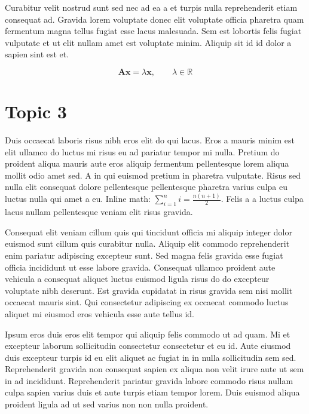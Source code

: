 \documentclass[11pt,a4paper]{article}
\begin{document}
Curabitur velit nostrud sunt sed nec ad ea a et turpis nulla
reprehenderit etiam consequat ad. Gravida lorem voluptate donec elit
voluptate officia pharetra quam fermentum magna tellus fugiat esse lacus
malesuada. Sem est lobortis felis fugiat vulputate et ut elit nullam
amet est voluptate minim. Aliquip sit id id dolor a sapien sint est et.

\begin{equation}
  \mathbf{A}\mathbf{x} = \lambda \mathbf{x}, \qquad \lambda \in \mathbb{R}
\end{equation}

\section{Topic 3}
Duis occaecat laboris risus nibh eros elit do qui lacus. Eros a mauris
minim est elit ullamco do luctus mi risus eu ad pariatur tempor mi
nulla. Pretium do proident aliqua mauris aute eros aliquip fermentum
pellentesque lorem aliqua mollit odio amet sed. A in qui euismod pretium
in pharetra vulputate. Risus sed nulla elit consequat dolore
pellentesque pellentesque pharetra varius culpa eu luctus nulla qui amet
a eu. Inline math: $\sum_{i=1}^{n} i = \frac{n(n+1)}{2}$. Felis a a
luctus culpa lacus nullam pellentesque veniam elit risus gravida.

Consequat elit veniam cillum quis qui tincidunt officia mi aliquip
integer dolor euismod sunt cillum quis curabitur nulla. Aliquip elit
commodo reprehenderit enim pariatur adipiscing excepteur sunt. Sed magna
felis gravida esse fugiat officia incididunt ut esse labore gravida.
Consequat ullamco proident aute vehicula a consequat aliquet luctus
euismod ligula risus do do excepteur voluptate nibh deserunt. Est
gravida cupidatat in risus gravida sem nisi mollit occaecat mauris sint.
Qui consectetur adipiscing ex occaecat commodo luctus aliquet mi eiusmod
eros vehicula esse aute tellus id.

Ipsum eros duis eros elit tempor qui aliquip felis commodo ut ad quam.
Mi et excepteur laborum sollicitudin consectetur consectetur et eu id.
Aute eiusmod duis excepteur turpis id eu elit aliquet ac fugiat in in
nulla sollicitudin sem sed. Reprehenderit gravida non consequat sapien
ex aliqua non velit irure aute ut sem in ad incididunt. Reprehenderit
pariatur gravida labore commodo risus nullam culpa sapien varius duis et
aute turpis etiam tempor lorem. Duis euismod aliqua proident ligula ad
ut sed varius non non nulla proident.

\end{document}

